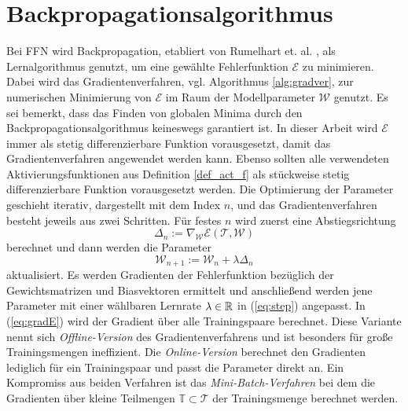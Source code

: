 

 \section*{Backpropagationsalgorithmus}
Bei FFN wird Backpropagation, etabliert von Rumelhart et. al. \cite{MLPbook}, als Lernalgorithmus genutzt, um eine gewählte Fehlerfunktion $\mathcal{E}$ zu minimieren. Dabei wird das Gradientenverfahren, vgl. Algorithmus \ref{alg:gradver}, zur numerischen Minimierung von $\mathcal{E}$ im Raum der Modellparameter $\mathcal{W}$ genutzt. Es sei bemerkt, dass das Finden von globalen Minima durch den Backpropagationsalgorithmus keineswegs garantiert ist.
In dieser Arbeit wird $\mathcal{E}$ immer als stetig differenzierbare Funktion vorausgesetzt, damit das Gradientenverfahren angewendet werden kann. Ebenso sollten alle verwendeten Aktivierungsfunktionen aus Definition \ref{def_act_f} als stückweise stetig differenzierbare Funktion vorausgesetzt werden. 
Die Optimierung der Parameter geschieht iterativ, dargestellt mit dem Index $n$, und das Gradientenverfahren besteht jeweils aus zwei Schritten. Für festes $n$ wird zuerst eine Abstiegsrichtung 
\begin{equation}
    \label{eq:gradE}
    \Delta_n := \nabla_{\mathcal{W}} \mathcal{E}(\mathcal{T},\mathcal{W})
\end{equation} 
berechnet und dann werden die Parameter 
\begin{equation}
    \label{eq:step}
    \mathcal{W}_{n+1}:=\mathcal{W}_n + \lambda \Delta_n
\end{equation}
aktualisiert. Es werden Gradienten der Fehlerfunktion bezüglich der Gewichtsmatrizen und Biasvektoren ermittelt und anschließend werden jene Parameter mit einer wählbaren Lernrate $\lambda \in \mathbb{R}$ in (\ref{eq:step}) angepasst. In (\ref{eq:gradE}) wird der Gradient über alle Trainingspaare berechnet. Diese Variante nennt sich \textit{Offline-Version} des Gradientenverfahrens und ist besonders für große Trainingsmengen ineffizient. Die \textit{Online-Version} berechnet den Gradienten lediglich für ein Trainingspaar und passt die Parameter direkt an. Ein Kompromiss aus beiden Verfahren ist das \textit{Mini-Batch-Verfahren} bei dem die Gradienten über kleine Teilmengen $\mathbb{T} \subset \mathcal{T}$ der Trainingsmenge berechnet werden.
